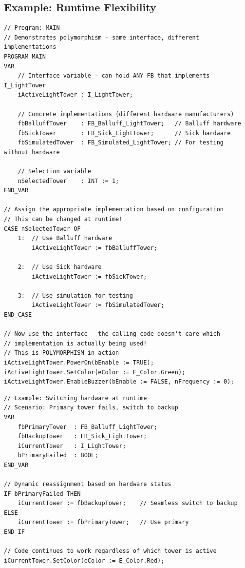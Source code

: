 \documentclass[11pt,a4paper]{article}
\begin{document}
\subsection*{Example: Runtime Flexibility}

\begin{lstlisting}
// Program: MAIN
// Demonstrates polymorphism - same interface, different implementations
PROGRAM MAIN
VAR
    // Interface variable - can hold ANY FB that implements I_LightTower
    iActiveLightTower : I_LightTower;
    
    // Concrete implementations (different hardware manufacturers)
    fbBalluffTower    : FB_Balluff_LightTower;   // Balluff hardware
    fbSickTower       : FB_Sick_LightTower;      // Sick hardware
    fbSimulatedTower  : FB_Simulated_LightTower; // For testing without hardware
    
    // Selection variable
    nSelectedTower    : INT := 1;
END_VAR

// Assign the appropriate implementation based on configuration
// This can be changed at runtime!
CASE nSelectedTower OF
    1:  // Use Balluff hardware
        iActiveLightTower := fbBalluffTower;
        
    2:  // Use Sick hardware
        iActiveLightTower := fbSickTower;
        
    3:  // Use simulation for testing
        iActiveLightTower := fbSimulatedTower;
END_CASE

// Now use the interface - the calling code doesn't care which 
// implementation is actually being used!
// This is POLYMORPHISM in action
iActiveLightTower.PowerOn(bEnable := TRUE);
iActiveLightTower.SetColor(eColor := E_Color.Green);
iActiveLightTower.EnableBuzzer(bEnable := FALSE, nFrequency := 0);
\end{lstlisting}

\begin{lstlisting}
// Example: Switching hardware at runtime
// Scenario: Primary tower fails, switch to backup
VAR
    fbPrimaryTower  : FB_Balluff_LightTower;
    fbBackupTower   : FB_Sick_LightTower;
    iCurrentTower   : I_LightTower;
    bPrimaryFailed  : BOOL;
END_VAR

// Dynamic reassignment based on hardware status
IF bPrimaryFailed THEN
    iCurrentTower := fbBackupTower;    // Seamless switch to backup
ELSE
    iCurrentTower := fbPrimaryTower;   // Use primary
END_IF

// Code continues to work regardless of which tower is active
iCurrentTower.SetColor(eColor := E_Color.Red);
\end{lstlisting}
\end{document}
